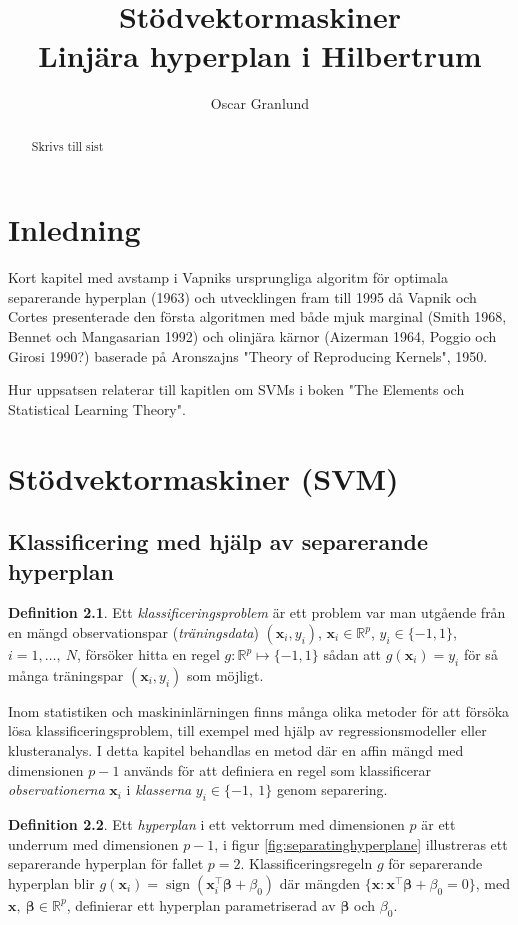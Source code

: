 \documentclass[a4paper, 12pt]{report}
\title{Stödvektormaskiner\\
{\large Linjära hyperplan i Hilbertrum}}
\author{Oscar Granlund}
\DeclareMathOperator{\sign}{sign}
\theoremstyle{definition}
\newtheorem{defi}{Definition}[section]
\theoremstyle{remark}
\newcommand{\bfbeta}{{\boldsymbol{\beta}}}
\begin{document}
\maketitle

\begin{abstract}
	Skrivs till sist
\end{abstract}

\chapter{Inledning}
Kort kapitel med avstamp i Vapniks ursprungliga algoritm för optimala separerande hyperplan (1963) och utvecklingen fram till 1995 då Vapnik och Cortes presenterade den första algoritmen med både mjuk marginal (Smith 1968, Bennet och Mangasarian 1992) och olinjära kärnor (Aizerman 1964, Poggio och Girosi 1990?) baserade på Aronszajns "Theory of Reproducing Kernels", 1950.

Hur uppsatsen relaterar till kapitlen om SVMs i boken "The Elements och Statistical Learning Theory".

\chapter{Stödvektormaskiner (SVM)}

\section{Klassificering med hjälp av separerande hyperplan}

\begin{defi}
	Ett \textit{klassificeringsproblem} är ett problem var man utgående från en mängd observationspar (\textit{träningsdata}) $(\mathbf{x}_i,y_i)$, $\mathbf{x}_i\in\mathbb{R}^p$, $y_i\in \{-1,1\}$, $i=1,\dots,~N$, försöker hitta en regel $g: \mathbb{R}^p \longmapsto \{-1,1\}$ sådan att $g(\mathbf{x}_i)=y_i$ för så många träningspar $(\mathbf{x}_i,y_i)$ som möjligt.
\end{defi}

Inom statistiken och maskininlärningen finns många olika metoder för att försöka lösa klassificeringsproblem, till exempel med hjälp av regressionsmodeller eller klusteranalys. I detta kapitel behandlas en metod där en affin mängd med dimensionen $p-1$ används för att definiera en regel som klassificerar \textit{observationerna} $\mathbf{x}_i$ i \textit{klasserna} $y_i\in\{-1,~1\}$ genom separering.

\begin{defi}
	Ett \textit{hyperplan} i ett vektorrum med dimensionen $p$ är ett underrum med dimensionen $p-1$, i figur \ref{fig:separatinghyperplane} illustreras ett separerande hyperplan för fallet $p=2$. Klassificeringsregeln $g$ för separerande hyperplan blir $g(\mathbf{x}_i)=\sign (\mathbf{x}_i^\intercal    \bfbeta + \beta_0)$ där mängden $\{\mathbf{x}: \mathbf{x}^\intercal \bfbeta + \beta_0=0\}$, med $\mathbf{x},~\bfbeta\in \mathbb{R}^p$, definierar ett hyperplan parametriserad av $\bfbeta$ och $\beta_0$.
\end{defi}
\end{document}
